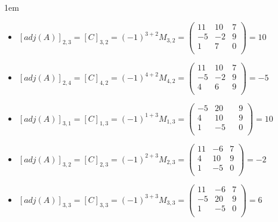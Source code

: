 \documentclass[12pt, fleqn]{article}                             %
\newenvironment{SmallIndentation}[1][0.75em]                    %
        {\begin{adjustwidth}{#1}{}\begin{footnotesize}}             %
        {\end{footnotesize}\end{adjustwidth}}                       %
\theoremstyle{break}                                            %
\newcommand{\pVector}[1]                                        %
        { \ensuremath{\begin{pmatrix}#1\end{pmatrix}} }             %
\begin{document}
\begin{itemize}
\begin{SmallIndentation}[1em]
\begin{itemize}
                    \item
                        $[adj(A)]_{2, 3} 
                            = [C]_{3, 2} 
                            = (-1)^{3+2} M_{3, 2}
                            = \pVector{
                                    11 & 10 & 7   \\ 
                                    -5 & -2 & 9   \\
                                    1  & 7 & 0    \\
                                }
                            = 10$

                    \item
                        $[adj(A)]_{2, 4} 
                            = [C]_{4, 2} 
                            = (-1)^{4+2} M_{4, 2}
                            = \pVector{
                                    11 & 10 & 7   \\ 
                                    -5 & -2 & 9   \\
                                    4  & 6 & 9    \\
                                }
                            = -5$

                    \item
                        $[adj(A)]_{3, 1} 
                            = [C]_{1, 3} 
                            = (-1)^{1+3} M_{1, 3}
                            = \pVector{
                                    -5 & 20 & & 9   \\
                                    4  & 10 & & 9    \\
                                    1  & -5 & & 0    \\
                                }
                            = 10$

                    \item
                        $[adj(A)]_{3, 2} 
                            = [C]_{2, 3} 
                            = (-1)^{2+3} M_{2, 3}
                            = \pVector{
                                    11 & -6  & 7   \\ 
                                    4  & 10 & 9    \\
                                    1  & -5 & 0    \\
                                }
                            = -2$

                    \item
                        $[adj(A)]_{3, 3} 
                            = [C]_{3, 3} 
                            = (-1)^{3+3} M_{3, 3}
                            = \pVector{
                                    11 & -6  & 7   \\ 
                                    -5 & 20  & 9   \\
                                    1  & -5 & 0    \\
                                }
                            = 6$


\end{itemize}
\end{SmallIndentation}
\end{itemize}
\end{document}
